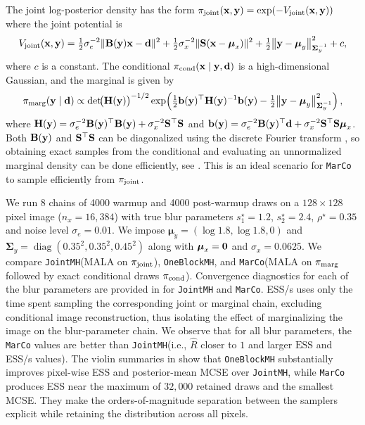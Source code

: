 \documentclass[onefignum,onetabnum]{siamonline250211}
\newcommand{\thf}  {\tfrac{1}{2}}                            %
\renewcommand{\t} {^{\top}}                                %
\newcommand{\bfSigma}{{\boldsymbol{\Sigma}}}
\newcommand{\bfmu}{{\boldsymbol{\mu}}}
\newcommand{\bfB}{{\bf B}}
\newcommand{\bfH}{{\bf H}}
\newcommand{\bfS}{{\bf S}}
\newcommand{\bfb}{{\bf b}}
\newcommand{\bfd}{{\bf d}}
\newcommand{\bfx}{{\bf x}}
\newcommand{\bfy}{{\bf y}}
\newcommand{\bfzero}{{\bf0}}
\newcommand{\nx}{{n_{x}}}
\newcommand{\pjoint}{\pi_{\rm joint}}
\newcommand{\pcond}{\pi_{\rm cond}}
\newcommand{\pmarg}{\pi_{\rm marg}}
\newcommand{\ESS}{\mathrm{ESS}}
\newcommand{\MarCo}{\textnormal{\texttt{MarCo}}\xspace}
\newcommand{\Joint}{\textnormal{\texttt{JointMH}}\xspace}
\newcommand{\OneblockMCMC}{\textnormal{\texttt{OneBlockMH}}\xspace}
\begin{document}
%
The joint log-posterior density has the form
$\pjoint(\bfx, \bfy) = \exp(-V_{\rm joint}(\bfx, \bfy))$ where the joint potential is
\begin{equation}
  \label{eq:deblur-posterior}
 V_{\rm joint}(\bfx,\bfy)  =
 \thf \sigma_{e}^{-2} \| \bfB(\bfy)\bfx - \bfd\|^2 +  \thf \sigma_x^{-2} \| \bfS(\bfx - \bfmu_x)\|^2  + \thf \bigl\|\bfy - \bfmu_y \bigr\|_{\bfSigma_y^{-1}}^2 + c,
\end{equation}
where $c$ is a constant.
%
%
%
%
%
%
%
%
%
%
The conditional $\pcond(\bfx \mid \bfy, \bfd)$ is a high-dimensional Gaussian, and
the marginal is given by
%
%
%
%
%
\begin{equation}
\label{eq:deblur_marg}
\pmarg(\bfy\mid\bfd)  \mathrel{\propto}
\det\!\bigl(\bfH(\bfy)\bigr)^{-1/2}
    \exp\!\left(
    \thf\bfb(\bfy)\t\bfH(\bfy)^{-1}\bfb(\bfy)
    - \thf \bigl\|\bfy - \bfmu_y \bigr\|_{\bfSigma_y^{-1}}^2\right),
\end{equation}
where
$\bfH(\bfy) = \sigma_e^{-2}
    \bfB(\bfy)\t\bfB(\bfy)
    +\sigma_x^{-2}\bfS\t\bfS$ and $    \bfb(\bfy)=\sigma_e^{-2}\bfB(\bfy)\t\bfd+\sigma_x^{-2} \bfS\t \bfS \bfmu_x$.
%
%
%
%
%
%
%
%
%
%
%
%
%
%
%
%
%
%
%
%
%
%
%
%
%
%
%
%
Both $\bfB(\bfy)$ and $\bfS\t \bfS$ can be diagonalized using the discrete Fourier transform \cite{hansen_deblurring_2006}, so obtaining exact samples from the conditional and evaluating an unnormalized marginal density can be done efficiently, see .
This is an ideal scenario for \MarCo to sample efficiently from $\pjoint$.%

We run 8 chains of 4000 warmup and 4000 post-warmup draws on a $128\times128$ pixel image ($\nx = 16{,}384$) with true blur parameters $s_1^\star = 1.2$, $s_2^\star = 2.4$, $\rho^\star = 0.35$ and noise level $\sigma_{e} = 0.01$.
We impose $\bfmu_y = (\log 1.8,\log 1.8,0)$ and $ \bfSigma_y = \operatorname{diag}(0.35^2,0.35^2,0.45^2)$ along with $\bfmu_x = \bfzero$ and $\sigma_x = 0.0625$.
We compare \Joint (MALA on $\pjoint$), \OneblockMCMC, and \MarCo (MALA on $\pmarg$ followed by exact conditional draws $\pcond$).
Convergence diagnostics for each of the blur parameters are provided in  for \Joint and \MarCo.  ESS/s uses only the time spent sampling the corresponding joint or marginal chain, excluding conditional image reconstruction, thus isolating the effect of marginalizing the image on the blur-parameter chain.  We observe that for all blur parameters, the \MarCo values are better than \Joint (i.e.,  $\hat R$ closer to $1$ and larger $\ESS$ and ESS/s values).
The violin summaries in  show that \OneblockMCMC substantially improves pixel-wise ESS and posterior-mean MCSE over \Joint, while \MarCo produces ESS near the maximum of $32{,}000$ retained draws and the smallest MCSE.
They make the orders-of-magnitude separation between the samplers explicit while retaining the distribution across all pixels.
\end{document}

